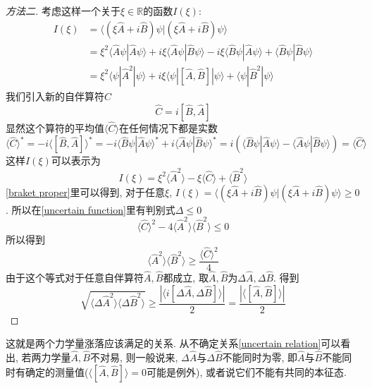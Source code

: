 \documentclass[a4paper,11pt]{book}
\newtheorem{proof}{证明}[section]
\newcommand{\A}{\hat{A}}
\newcommand{\B}{\hat{B}}
\begin{document}
\begin{proof}[方法二]
  考虑这样一个关于$\xi\in\mathbb{R}$的函数$I(\xi)$:
  \begin{equation*}
    \begin{split}
       I(\xi)&=\langle(\xi\hat{A}+i\hat{B})\psi|(\xi\hat{A}+i\hat{B})\psi\rangle\\
         &=\xi^2\langle\hat{A}\psi|\hat{A}\psi\rangle+i\xi\langle\hat{A}\psi|\hat{B}\psi\rangle-i\xi\langle\hat{B}\psi|\hat{A}\psi\rangle+\langle\hat{B}\psi|\hat{B}\psi\rangle\\
         &=\xi^2\langle\psi|\hat{A}^2|\psi\rangle+i\xi\langle\psi|[\hat{A},\hat{B}]|\psi\rangle+\langle\psi|\hat{B}^2|\psi\rangle
    \end{split}
  \end{equation*}
  我们引入新的自伴算符$\hat{C}$
  \begin{equation*}
    \hat{C}=i[\hat{B},\hat{A}]
  \end{equation*}
  显然这个算符的平均值$\langle\hat{C}\rangle$在任何情况下都是实数
  \begin{equation*}
    \langle\hat{C}\rangle^*=-i\langle[\hat{B},\hat{A}]\rangle^*=-i\langle\hat{B}\psi|\hat{A}\psi\rangle^*+i\langle\hat{A}\psi|\hat{B}\psi\rangle^*=i(\langle\hat{B}\psi|\hat{A}\psi\rangle-\langle\hat{A}\psi|\hat{B}\psi\rangle)=\langle\hat{C}\rangle
  \end{equation*}
  这样$I(\xi)$可以表示为
  \begin{equation}\label{uncertain function}
    I(\xi)=\xi^2\langle\hat{A}^2\rangle-\xi\langle\hat{C}\rangle+\langle\hat{B}^2\rangle
  \end{equation}
  \eqref{braket proper}里可以得到, 对于任意$\xi$, $I(\xi)=\langle(\xi\hat{A}+i\hat{B})\psi|(\xi\hat{A}+i\hat{B})\psi\rangle\geq 0$. 所以在\eqref{uncertain function}里有判别式$\Delta\leq0$
  \begin{equation*}
    \langle\hat{C}\rangle^2-4\langle\hat{A}^2\rangle\langle\hat{B}^2\rangle\leq0
  \end{equation*}
  所以得到
  \begin{equation*}
    \langle\hat{A}^2\rangle\langle\hat{B}^2\rangle\geq\frac{\langle\hat{C}\rangle^2}{4}
  \end{equation*}
  由于这个等式对于任意自伴算符$\hat{A},\hat{B}$都成立, 取$\hat{A},\hat{B}$为$\Delta\hat{A},\Delta\hat{B}$. 得到
  \begin{equation*}
    \sqrt{\langle\Delta\hat{A}^2\rangle\langle\Delta\hat{B}^2\rangle}\geq\frac{|\langle i[\Delta\hat{A},\Delta\hat{B}]\rangle|}{2}=\frac{|\langle[\hat{A},\hat{B}]\rangle|}{2}
  \end{equation*}
\end{proof}
这就是两个力学量涨落应该满足的关系. 从不确定关系\ref{uncertain relation}可以看出, 若两力学量$\A,\B$不对易, 则一般说来, $\Delta\A$与$\Delta\B$不能同时为零, 即$\A$与$\B$不能同时有确定的测量值($\langle[\A,\B]\rangle=0$可能是例外), 或者说它们不能有共同的本征态.
\end{document}
